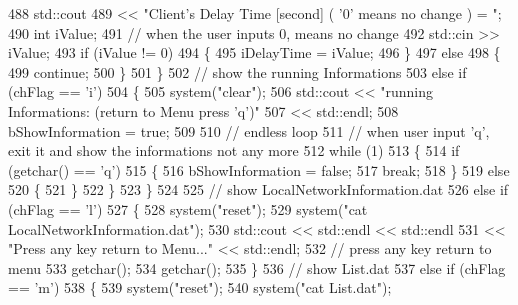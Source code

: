 \begin{DoxyCode}
488             std::cout
489                     << \textcolor{stringliteral}{"Client's Delay Time [second] ( '0' means no change ) = "};
490             \textcolor{keywordtype}{int} iValue;
491             \textcolor{comment}{// when the user inputs 0, means no change}
492             std::cin >> iValue;
493             \textcolor{keywordflow}{if} (iValue != 0)
494             \{
495                 iDelayTime = iValue;
496             \}
497             \textcolor{keywordflow}{else}
498             \{
499                 \textcolor{keywordflow}{continue};
500             \}
501         \}
502         \textcolor{comment}{// show the running Informations}
503         \textcolor{keywordflow}{else} \textcolor{keywordflow}{if} (chFlag == \textcolor{charliteral}{'i'})
504         \{
505             system(\textcolor{stringliteral}{"clear"});
506             std::cout << \textcolor{stringliteral}{"running Informations: (return to Menu press 'q')"}
507                     << std::endl;
508             bShowInformation = \textcolor{keyword}{true};
509 
510             \textcolor{comment}{// endless loop }
511             \textcolor{comment}{// when user input 'q', exit it and show the informations not any more}
512             \textcolor{keywordflow}{while} (1)
513             \{
514                 \textcolor{keywordflow}{if} (getchar() == \textcolor{charliteral}{'q'})
515                 \{
516                     bShowInformation = \textcolor{keyword}{false};
517                     \textcolor{keywordflow}{break};
518                 \}
519                 \textcolor{keywordflow}{else}
520                 \{
521                 \}
522             \}
523         \}
524 
525         \textcolor{comment}{// show LocalNetworkInformation.dat}
526         \textcolor{keywordflow}{else} \textcolor{keywordflow}{if} (chFlag == \textcolor{charliteral}{'l'})
527         \{
528             system(\textcolor{stringliteral}{"reset"});
529             system(\textcolor{stringliteral}{"cat LocalNetworkInformation.dat"});
530             std::cout << std::endl << std::endl
531                     << \textcolor{stringliteral}{"Press any key return to Menu..."} << std::endl;
532             \textcolor{comment}{// press any key return to menu}
533             getchar();
534             getchar();
535         \}
536         \textcolor{comment}{// show List.dat}
537         \textcolor{keywordflow}{else} \textcolor{keywordflow}{if} (chFlag == \textcolor{charliteral}{'m'})
538         \{
539             system(\textcolor{stringliteral}{"reset"});
540             system(\textcolor{stringliteral}{"cat List.dat"});

\end{DoxyCode}

